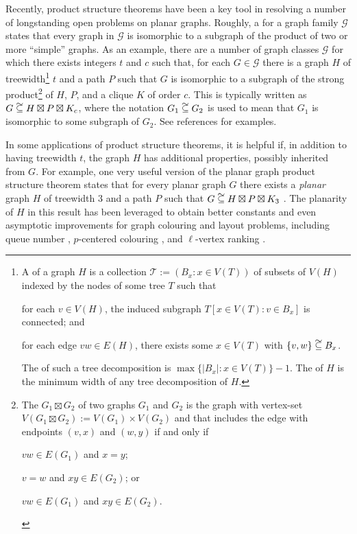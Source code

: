 \documentclass{patmorin}
\newcommand\subsetcong{\mathrel{\text{%
    \setbox0\hbox{$\subseteq$}%
    \rlap{\hbox to \wd0{\hss\hss\hss\raisebox{1.5\height}{$\sim$}\hss}}\box0
}}}
\begin{document}
Recently, product structure theorems have been a key tool in resolving a number of longstanding open problems on planar graphs.  Roughly, a  for a graph family $\mathcal{G}$ states that every graph in $\mathcal{G}$ is isomorphic to a subgraph of the product of two or more ``simple'' graphs.  As an example, there are a number of graph classes $\mathcal{G}$ for which there exists integers $t$ and $c$ such that, for each $G\in\mathcal{G}$ there is a graph $H$ of treewidth\footnote{A  of a graph $H$ is a collection $\mathcal{T}:=(B_x:x\in V(T))$ of subsets of $V(H)$ indexed by the nodes of some tree $T$ such that
\begin{inparaenum}[(i)]
  \item for each $v\in V(H)$, the induced subgraph $T[x\in V(T):v\in B_x]$ is connected; and
  \item for each edge $vw\in E(H)$, there exists some $x\in V(T)$ with $\{v,w\}\subsetcong B_x$.
\end{inparaenum}
The  of such a tree decomposition is $\max\{|B_x|:x\in V(T)\}-1$. The  of $H$ is the minimum width of any tree decomposition of $H$.} $t$ and a path $P$ such that $G$ is isomorphic to a subgraph of the strong product\footnote{The  $G_1\boxtimes G_2$ of two graphs $G_1$ and $G_2$ is the graph with vertex-set $V(G_1\boxtimes G_2):=V(G_1)\times V(G_2)$ and that includes the edge with endpoints $(v,x)$ and $(w,y)$ if and only if
\begin{inparaenum}[(i)]
  \item $vw\in E(G_1)$ and $x=y$;
  \item $v=w$ and $xy\in E(G_2)$; or
  \item $vw\in E(G_1)$ and $xy\in E(G_2)$.
\end{inparaenum}
} of $H$, $P$, and a clique $K$ of order $c$.
This is typically written as $G\subsetcong H\boxtimes P\boxtimes K_c$, where the notation $G_1\subsetcong G_2$ is used to mean that $G_1$ is isomorphic to some subgraph of $G_2$.  See references \cite{dujmovic.joret.ea:planar,dujmovic.morin.ea:structure,krauthgamer.lee:intrinsic,ueckerdt.wood.ea:improved,bose.morin.ea:optimal,campbell.clinch.ea:product,illingworth.scott.ea:alon,distel.hickingbotham.ea:improved,hickingbotham.jungeblut.ea:product,hickingbotham.wood:shallow,wood:product} for examples.

In some applications of product structure theorems, it is helpful if, in addition to having treewidth $t$, the graph $H$ has additional properties, possibly inherited from $G$.  For example, one very useful version of the planar graph product structure theorem states that for every planar graph $G$ there exists a \emph{planar} graph $H$ of treewidth $3$ and a path $P$ such that $G\subsetcong H\boxtimes P\boxtimes K_3$ \cite[Theorem~36(b)]{dujmovic.joret.ea:planar}.  The planarity of $H$ in this result has been leveraged to obtain better constants and even asymptotic improvements for graph colouring and layout problems, including queue number \cite{dujmovic.joret.ea:planar}, $p$-centered colouring \cite{debski.felsner.ea:improved}, and $\ell$-vertex ranking \cite{bose.dujmovic.ea:asymptotically}.
\end{document}
